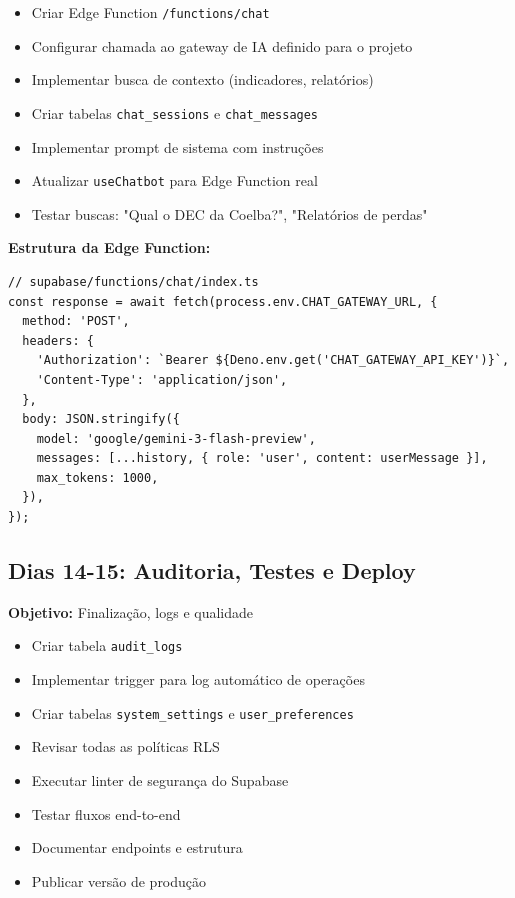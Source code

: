 \documentclass[12pt,a4paper]{article}
\newcommand{\checkbox}{$\square$}
\begin{document}
\begin{itemize}[label=\checkbox]
    \item Criar Edge Function \texttt{/functions/chat}
    \item Configurar chamada ao gateway de IA definido para o projeto
    \item Implementar busca de contexto (indicadores, relatórios)
    \item Criar tabelas \texttt{chat\_sessions} e \texttt{chat\_messages}
    \item Implementar prompt de sistema com instruções
    \item Atualizar \texttt{useChatbot} para Edge Function real
    \item Testar buscas: "Qual o DEC da Coelba?", "Relatórios de perdas"
\end{itemize}

\textbf{Estrutura da Edge Function:}
\begin{verbatim}
// supabase/functions/chat/index.ts
const response = await fetch(process.env.CHAT_GATEWAY_URL, {
  method: 'POST',
  headers: {
    'Authorization': `Bearer ${Deno.env.get('CHAT_GATEWAY_API_KEY')}`,
    'Content-Type': 'application/json',
  },
  body: JSON.stringify({
    model: 'google/gemini-3-flash-preview',
    messages: [...history, { role: 'user', content: userMessage }],
    max_tokens: 1000,
  }),
});
\end{verbatim}

\subsection{Dias 14-15: Auditoria, Testes e Deploy}

\begin{tcolorbox}[colback=green!5!white,colframe=neogreen]
\textbf{Objetivo:} Finalização, logs e qualidade
\end{tcolorbox}

\begin{itemize}[label=\checkbox]
    \item Criar tabela \texttt{audit\_logs}
    \item Implementar trigger para log automático de operações
    \item Criar tabelas \texttt{system\_settings} e \texttt{user\_preferences}
    \item Revisar todas as políticas RLS
    \item Executar linter de segurança do Supabase
    \item Testar fluxos end-to-end
    \item Documentar endpoints e estrutura
    \item Publicar versão de produção
\end{itemize}
\end{document}
